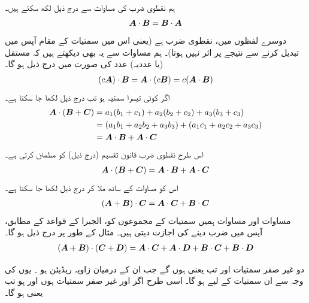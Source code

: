 ہم نقطوی ضرب کی مساوات  سے  درج ذیل لکھ سکتے ہیں۔
\begin{align}\label{مساوات_سمتیہ_قواعد_ضرب_نقطہ_الف}
{\ensuremath{{\boldsymbol{A}}}}\cdot{\ensuremath{{\boldsymbol{B}}}}={{\boldsymbol{B}}}\cdot{\ensuremath{{\boldsymbol{A}}}}
\end{align}
دوسرے لفظوں میں، نقطوی ضرب  ہے (یعنی اس میں سمتیات کے مقام  آپس میں تبدیل کرنے سے نتیجے پر اثر نہیں ہوتا)۔ ہم مساوات  سے  یہ بھی دیکھتے ہیں کہ مستقل (یا عددیہ) عدد  کی صورت میں درج ذیل ہو گا۔
\begin{align}\label{مساوات_سمتیہ_قواعد_ضرب_نقطہ_ب}
(c{{\boldsymbol{A}}})\cdot{\ensuremath{{\boldsymbol{B}}}}={{\boldsymbol{A}}}\cdot(c{{\boldsymbol{B}}})=c({{\boldsymbol{A}}}\cdot{\ensuremath{{\boldsymbol{B}}}})
\end{align}
اگر  کوئی تیسرا سمتیہ ہو تب درج ذیل لکھا جا سکتا ہے۔
\begin{align*}
{\ensuremath{{\boldsymbol{A}}}}\cdot({{\boldsymbol{B}}}+{{\boldsymbol{C}}})&=a_1(b_1+c_1)+a_2(b_2+c_2)+a_3(b_3+c_3)\\
&=(a_1b_1+a_2b_2+a_3b_3)+(a_1c_1+a_2c_2+a_3c_3)\\
&={{\boldsymbol{A}}}\cdot{\ensuremath{{\boldsymbol{B}}}}+{{\boldsymbol{A}}}\cdot{\ensuremath{{\boldsymbol{C}}}}
\end{align*}
اس طرح نقطوی ضرب قانون تقسیم (درج ذیل)  کو مطمئن کرتی  ہے۔
\begin{align}\label{مساوات_سمتیہ_قواعد_ضرب_نقطہ_پ}
{\ensuremath{{\boldsymbol{A}}}}\cdot({{\boldsymbol{B}}}+{{\boldsymbol{C}}})={{\boldsymbol{A}}}\cdot{\ensuremath{{\boldsymbol{B}}}}+{{\boldsymbol{A}}}\cdot{\ensuremath{{\boldsymbol{C}}}}
\end{align}
اس کو مساوات  کے ساتھ ملا کر درج ذیل لکھا جا سکتا ہے۔
\begin{align}\label{مساوات_سمتیہ_قواعد_ضرب_نقطہ_ت}
({{\boldsymbol{A}}}+{{\boldsymbol{B}}})\cdot{\ensuremath{{\boldsymbol{C}}}}={{\boldsymbol{A}}}\cdot{\ensuremath{{\boldsymbol{C}}}}+{{\boldsymbol{B}}}\cdot{\ensuremath{{\boldsymbol{C}}}}
\end{align}
مساوات  اور مساوات  ہمیں سمتیات کے مجموعوں کو، الجبرا کے قواعد کے مطابق، آپس میں ضرب دینے کی اجازت دیتی  ہیں۔ مثال کے طور پر درج ذیل ہو گا۔
\begin{align}\label{مساوات_سمتیہ_قواعد_ضرب_نقطہ_ٹ}
({{\boldsymbol{A}}}+{{\boldsymbol{B}}})\cdot({{\boldsymbol{C}}}+{{\boldsymbol{D}}})={{\boldsymbol{A}}}\cdot{\ensuremath{{\boldsymbol{C}}}}+{{\boldsymbol{A}}}\cdot{\ensuremath{{\boldsymbol{D}}}}+{{\boldsymbol{B}}}\cdot{\ensuremath{{\boldsymbol{C}}}}+{{\boldsymbol{B}}}\cdot{\ensuremath{{\boldsymbol{D}}}}
\end{align}

دو غیر صفر سمتیات  اور  تب   یعنی  ہوں گے جب ان  کے درمیان  زاویہ   ریڈیئن  ہو ۔ یوں  کی وجہ سے  ان  سمتیات کے لیے  ہو گا۔ اسی طرح  اگر  اور  غیر صفر سمتیات ہوں اور  ہو تب  یعنی  ہو گا۔

